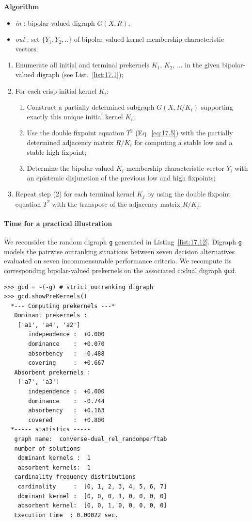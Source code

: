 \noindent \textbf{Algorithm} 
\begin{itemize}
 \item [] \emph{in} : bipolar-valued digraph $G(X,R)$,
 \item [] \emph{out} : set $\{Y_1, Y_2, .. \}$ of bipolar-valued kernel membership characteristic vectors.
\end{itemize}
\begin{enumerate}
\item Enumerate all initial and terminal prekernels $K_1$, $K_2$, ... in the given bipolar-valued digraph (see List.~\vref{list:17.1});
\item For each crisp initial kernel $K_i$:
  \begin{enumerate}
  \item Construct a partially determined subgraph $G(X,R/K_i)$ supporting exactly this unique initial kernel $K_i$;
  \item Use the double fixpoint equation $T^2$ (Eq.~\vref{eq:17.5}) with the partially determined adjacency matrix $R/K_i$ for computing a stable low and a stable high fixpoint;
   \item Determine the bipolar-valued $K_i$-membership characteristic vector $Y_i$ with an epistemic disjunction of the previous low and high fixpoints;
  \end{enumerate}
\item Repeat step (2) for each terminal kernel $K_j$ by using the double fixpoint equation $T^2$ with the transpose of the adjacency matrix $R/K_j$.
\end{enumerate}

\paragraph{\textbf{Time for a practical illustration}}

\noindent We reconsider the random digraph \texttt{g} generated in Listing~\vref{list:17.12}. Digraph \texttt{g} models the pairwise outranking situations between seven decision alternatives evaluated on seven incommensurable performance criteria. We recompute its corresponding bipolar-valued prekernels on the associated codual digraph \texttt{gcd}.
\begin{lstlisting}
>>> gcd = ~(-g) # strict outranking digraph
>>> gcd.showPreKernels()
  *--- Computing prekernels ---*
   Dominant prekernels :
    ['a1', 'a4', 'a2']
       independence :  +0.000
       dominance    :  +0.070
       absorbency   :  -0.488
       covering     :  +0.667
   Absorbent prekernels :
    ['a7', 'a3']
       independence :  +0.000
       dominance    :  -0.744
       absorbency   :  +0.163
       covered      :  +0.800
  *----- statistics -----
   graph name:  converse-dual_rel_randomperftab
   number of solutions
    dominant kernels :  1
    absorbent kernels:  1
   cardinality frequency distributions
    cardinality     :  [0, 1, 2, 3, 4, 5, 6, 7]
    dominant kernel :  [0, 0, 0, 1, 0, 0, 0, 0]
    absorbent kernel:  [0, 0, 1, 0, 0, 0, 0, 0]
   Execution time  : 0.00022 sec.
\end{lstlisting}

